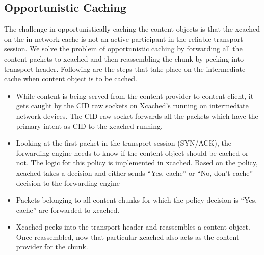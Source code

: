 \subsection{Opportunistic Caching}
The challenge in opportunistically caching the content objects is that
the xcached on the in-network cache is not an active participant in
the reliable transport session. We solve the problem of opportunistic
caching by forwarding all the content packets to xcached and then
reassembling the chunk by peeking into transport header. Following are
the steps that take place on the intermediate cache when content
object is to be cached.
\begin{itemize}
\item {While content is being served from the content provider to content
client, it gets caught by the CID raw sockets on Xcached's running
on intermediate network devices. The CID raw socket forwards all the
packets which have the primary intent as CID to the xcached
running.}
\item {Looking at the first packet in the transport session (SYN/ACK),
  the forwarding engine needs to know if the content object should be
  cached or not. The logic for this policy is implemented in
  xcached. Based on the policy, xcached takes a decision and either
  sends ``Yes, cache'' or ``No, don't cache'' decision to the
  forwarding engine}
\item {Packets belonging to all content chunks for which the policy
  decision is ``Yes, cache'' are forwarded to xcached.}
\item {Xcached peeks into the transport header and reassembles a
  content object. Once reassembled, now that particular xcached also
  acts as the content provider for the chunk.}
\end{itemize}


